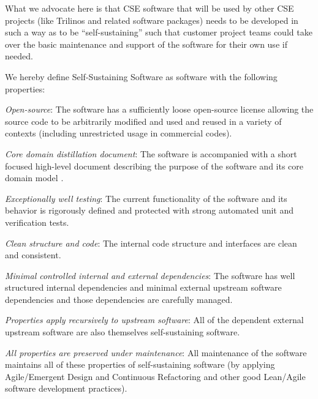 \documentclass[11pt]{SANDreport}
\begin{document}
What we advocate here is that CSE software that will be used by other
CSE projects (like Trilinos and related software packages) needs to be
developed in such a way as to be ``self-sustaining'' such that
customer project teams could take over the basic maintenance and
support of the software for their own use if needed.

We hereby define Self-Sustaining Software as software with the
following properties:
%
\begin{compactitem}

{}\item\textit{Open-source}: The software has a sufficiently loose
open-source license allowing the source code to be arbitrarily modified
and used and reused in a variety of contexts (including unrestricted
usage in commercial codes).

{}\item\textit{Core domain distillation document}: The software is
accompanied with a short focused high-level document describing the
purpose of the software and its core domain model
{}\cite{DomainDrivenDesign}.

{}\item\textit{Exceptionally well testing}: The current functionality
of the software and its behavior is rigorously defined and protected
with strong automated unit and verification tests.

{}\item\textit{Clean structure and code}: The internal code structure
and interfaces are clean and consistent.

{}\item\textit{Minimal controlled internal and external dependencies}:
The software has well structured internal dependencies and minimal
external upstream software dependencies and those dependencies are
carefully managed.

{}\item\textit{Properties apply recursively to upstream software}: All
of the dependent external upstream software are also themselves
self-sustaining software.

{}\item\textit{All properties are preserved under maintenance}: All
maintenance of the software maintains all of these properties of
self-sustaining software (by applying Agile/Emergent Design and
Continuous Refactoring and other good Lean/Agile software development
practices).

\end{compactitem}
\end{document}
